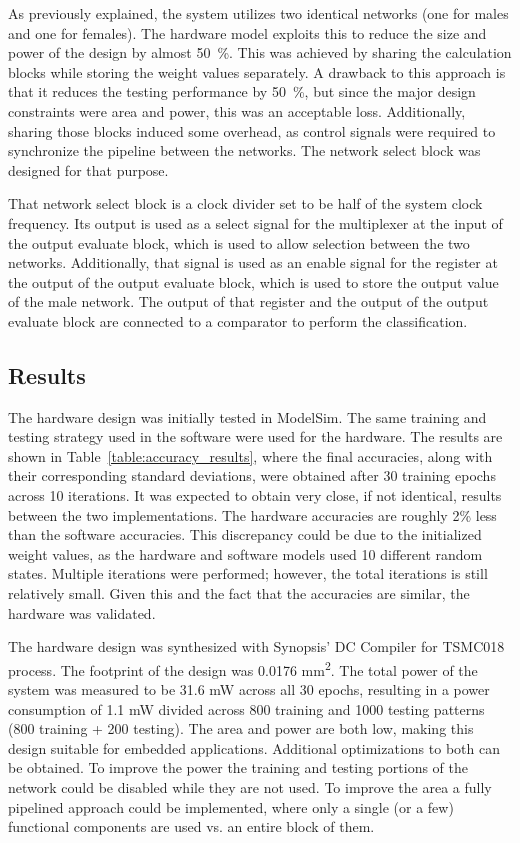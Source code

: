 \documentclass[10pt,journal]{IEEEtran}
\newcommand{\tbl}[1]{Table~\ref{#1}}
\begin{document}
			As previously explained, the system utilizes two identical networks (one for males and one for females). The hardware model exploits this to reduce the size and power of the design by almost 50~\%. This was achieved by sharing the calculation blocks while storing the weight values separately. A drawback to this approach is that it reduces the testing performance by 50~\%, but since the major design constraints were area and power, this was an acceptable loss. Additionally, sharing those blocks induced some overhead, as control signals were required to synchronize the pipeline between the networks. The network select block was designed for that purpose.
			
			That network select block is a clock divider set to be half of the system clock frequency. Its output is used as a select signal for the multiplexer at the input of the output evaluate block, which is used to allow selection between the two networks. Additionally, that signal is used as an enable signal for the register at the output of the output evaluate block, which is used to store the output value of the male network. The output of that register and the output of the output evaluate block are connected to a comparator to perform the classification.
	
	\subsection{Results}
		The hardware design was initially tested in ModelSim. The same training and testing strategy used in the software were used for the hardware. The results are shown in \tbl{table:accuracy_results}, where the final accuracies, along with their corresponding standard deviations, were obtained after 30 training epochs across 10 iterations. It was expected to obtain very close, if not identical, results between the two implementations. The hardware accuracies are roughly 2\% less than the software accuracies. This discrepancy could be due to the initialized weight values, as the hardware and software models used 10 different random states. Multiple iterations were performed; however, the total iterations is still relatively small. Given this and the fact that the accuracies are similar, the hardware was validated.
		
		The hardware design was synthesized with Synopsis' DC Compiler for TSMC018 process. The footprint of the design was 0.0176 mm\textsuperscript{2}. The total power of the system was measured to be 31.6 mW across all 30 epochs, resulting in a power consumption of 1.1 mW divided across 800 training and 1000 testing patterns (800 training + 200 testing). The area and power are both low, making this design suitable for embedded applications. Additional optimizations to both can be obtained. To improve the power the training and testing portions of the network could be disabled while they are not used. To improve the area a fully pipelined approach could be implemented, where only a single (or a few) functional components are used vs. an entire block of them.
		
\end{document}
